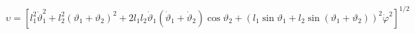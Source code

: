 $\upsilon = [l^2_1 \dot{\vartheta}^2_1 +
l^2_2(\vartheta _1 + \vartheta _2)^2 +
2l_1l_2\dot{\vartheta}_1(\dot{\vartheta}_1 +
\dot{\vartheta}_2)\cos{\vartheta_2} +
(l_1\sin{\vartheta _1} + l_2\sin{(\vartheta _1 + \vartheta _2)})^2
\dot{\varphi}^2]^{1/2}$
